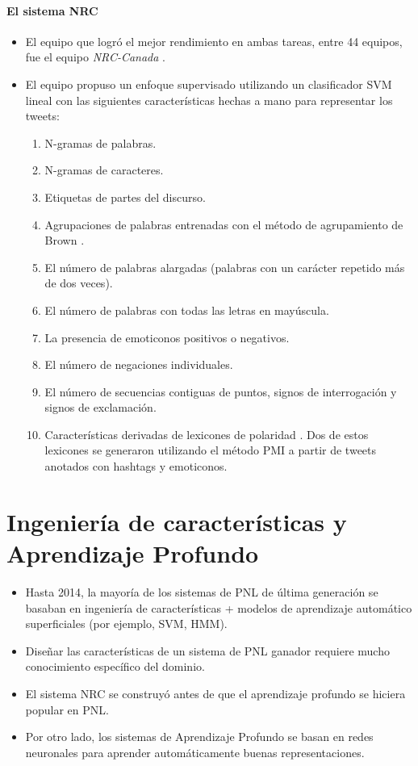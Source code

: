 \paragraph{El sistema NRC}
\begin{itemize}
   \item El equipo que logró el mejor rendimiento en ambas tareas, entre 44 equipos, fue el equipo \emph{NRC-Canada} \cite{Mohammad2013}.
   \item El equipo propuso un enfoque supervisado utilizando un clasificador SVM lineal con las siguientes características hechas a mano para representar los tweets:
   \begin{enumerate}
      \item N-gramas de palabras.
      \item N-gramas de caracteres.
      \item Etiquetas de partes del discurso.
      \item Agrupaciones de palabras entrenadas con el método de agrupamiento de Brown \cite{brown1992class}.
      \item El número de palabras alargadas (palabras con un carácter repetido más de dos veces).
      \item El número de palabras con todas las letras en mayúscula.
      \item La presencia de emoticonos positivos o negativos.
      \item El número de negaciones individuales.
      \item El número de secuencias contiguas de puntos, signos de interrogación y signos de exclamación.
      \item Características derivadas de lexicones de polaridad \cite{Mohammad2013}. Dos de estos lexicones se generaron utilizando el método PMI a partir de tweets anotados con hashtags y emoticonos.
   \end{enumerate}
\end{itemize}

\section{Ingeniería de características y Aprendizaje Profundo}

\begin{itemize}
   \item Hasta 2014, la mayoría de los sistemas de PNL de última generación se basaban en ingeniería de características + modelos de aprendizaje automático superficiales (por ejemplo, SVM, HMM).
   \item Diseñar las características de un sistema de PNL ganador requiere mucho conocimiento específico del dominio.
   \item El sistema NRC se construyó antes de que el aprendizaje profundo se hiciera popular en PNL.
   \item Por otro lado, los sistemas de Aprendizaje Profundo se basan en redes neuronales para aprender automáticamente buenas representaciones.
\end{itemize}

